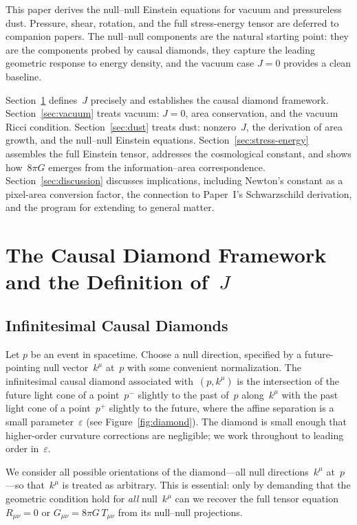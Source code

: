 \documentclass[12pt]{article}
\begin{document}
This paper derives the null--null Einstein equations for vacuum
and pressureless dust.
Pressure, shear, rotation, and the full stress-energy tensor
are deferred to companion papers.
The null--null components are the natural starting point:
they are the components probed by causal diamonds,
they capture the leading geometric response to energy density,
and the vacuum case $J=0$ provides a clean baseline.

Section~\ref{sec:diamond} defines~$J$ precisely and establishes
the causal diamond framework.
Section~\ref{sec:vacuum} treats vacuum: $J=0$, area conservation,
and the vacuum Ricci condition.
Section~\ref{sec:dust} treats dust: nonzero~$J$, the derivation
of area growth, and the null--null Einstein equations.
Section~\ref{sec:stress-energy} assembles the full Einstein tensor,
addresses the cosmological constant, and shows how~$8\pi G$
emerges from the information--area correspondence.
Section~\ref{sec:discussion} discusses implications, including
Newton's constant as a pixel-area conversion factor, the
connection to Paper~I's Schwarzschild derivation, and the
program for extending to general matter.

\section{The Causal Diamond Framework and the Definition of~$J$}
\label{sec:diamond}

\subsection{Infinitesimal Causal Diamonds}

Let $p$ be an event in spacetime.
Choose a null direction, specified by a future-pointing null
vector~$k^\mu$ at~$p$ with some convenient normalization.
The infinitesimal causal diamond associated with~$(p, k^\mu)$
is the intersection of the future light cone of a point~$p^-$
slightly to the past of~$p$ along~$k^\mu$ with the past light
cone of a point~$p^+$ slightly to the future, where the
affine separation is a small parameter~$\varepsilon$
(see Figure~\ref{fig:diamond}).
The diamond is small enough that higher-order curvature
corrections are negligible; we work throughout to leading
order in~$\varepsilon$.

We consider all possible orientations of the diamond---all
null directions~$k^\mu$ at~$p$---so that~$k^\mu$ is treated
as arbitrary.
This is essential: only by demanding that the geometric
condition hold for \emph{all} null~$k^\mu$ can we recover
the full tensor equation $R_{\mu\nu}=0$ or
$G_{\mu\nu}=8\pi G\,T_{\mu\nu}$ from its null--null
projections.
\end{document}
